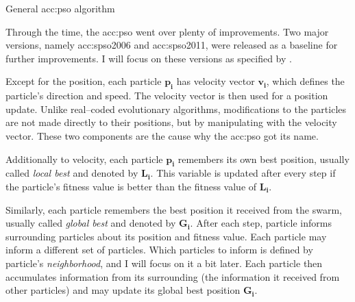 \begin{algorithm}[b!]
    \caption{General \acrfull*{acc:pso} algorithm}
    \label{alg:PSOgeneral}
\end{algorithm}

Through the time, the \acrshort{acc:pso} went over plenty of improvements. Two major versions, namely \acrfull{acc:spso2006} and \acrfull{acc:spso2011}, were released as a baseline for further improvements. I will focus on these versions as specified by \citet{SPSO}.

Except for the position, each particle $\mathbf{p_i}$ has velocity vector $\mathbf{v_i}$, which defines the particle's direction and speed. The velocity vector is then used for a position update. Unlike real--coded evolutionary algorithms, modifications to the particles are not made directly to their positions, but by manipulating with the velocity vector. These two components are the cause why the \acrshort{acc:pso} got its name.

Additionally to velocity, each particle $\mathbf{p_i}$ remembers its own best position, usually called \emph{local best} and denoted by $\mathbf{L_i}$. This variable is updated after every step if the particle's fitness value is better than the fitness value of $\mathbf{L_i}$.

Similarly, each particle remembers the best position it received from the swarm, usually called \emph{global best} and denoted by $\mathbf{G_i}$. After each step, particle informs surrounding particles about its position and fitness value. Each particle may inform a different set of particles. Which particles to inform is defined by particle's \emph{neighborhood}, and I will focus on it a bit later. Each particle then accumulates information from its surrounding (the information it received from other particles) and may update its global best position $\mathbf{G_i}$.

